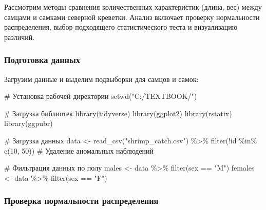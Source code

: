 \documentclass[
  letterpaper,
  DIV=11,
  numbers=noendperiod]{scrreprt}
\newenvironment{Shaded}{\begin{snugshade}}{\end{snugshade}}
\newcommand{\CommentTok}[1]{\textcolor[rgb]{0.37,0.37,0.37}{#1}}
\newcommand{\DecValTok}[1]{\textcolor[rgb]{0.68,0.00,0.00}{#1}}
\newcommand{\FunctionTok}[1]{\textcolor[rgb]{0.28,0.35,0.67}{#1}}
\newcommand{\NormalTok}[1]{\textcolor[rgb]{0.00,0.23,0.31}{#1}}
\newcommand{\OtherTok}[1]{\textcolor[rgb]{0.00,0.23,0.31}{#1}}
\newcommand{\SpecialCharTok}[1]{\textcolor[rgb]{0.37,0.37,0.37}{#1}}
\newcommand{\StringTok}[1]{\textcolor[rgb]{0.13,0.47,0.30}{#1}}
\begin{document}
Рассмотрим методы сравнения количественных характеристик (длина, вес)
между самцами и самками северной креветки. Анализ включает проверку
нормальности распределения, выбор подходящего статистического теста и
визуализацию различий.

\subsubsection{Подготовка
данных}\label{ux43fux43eux434ux433ux43eux442ux43eux432ux43aux430-ux434ux430ux43dux43dux44bux445}

Загрузим данные и выделим подвыборки для самцов и самок:

\begin{Shaded}
\begin{Highlighting}[]
\CommentTok{\# Установка рабочей директории}
\FunctionTok{setwd}\NormalTok{(}\StringTok{"C:/TEXTBOOK/"}\NormalTok{)}

\CommentTok{\# Загрузка библиотек  }
\FunctionTok{library}\NormalTok{(tidyverse)  }
\FunctionTok{library}\NormalTok{(ggplot2)  }
\FunctionTok{library}\NormalTok{(rstatix)}
\FunctionTok{library}\NormalTok{(ggpubr)}

\CommentTok{\# Загрузка данных  }
\NormalTok{data }\OtherTok{\textless{}{-}} \FunctionTok{read\_csv}\NormalTok{(}\StringTok{"shrimp\_catch.csv"}\NormalTok{) }\SpecialCharTok{\%\textgreater{}\%}
  \FunctionTok{filter}\NormalTok{(}\SpecialCharTok{!}\NormalTok{id }\SpecialCharTok{\%in\%} \FunctionTok{c}\NormalTok{(}\DecValTok{10}\NormalTok{, }\DecValTok{50}\NormalTok{))  }\CommentTok{\# Удаление аномальных наблюдений }

\CommentTok{\# Фильтрация данных по полу  }
\NormalTok{males }\OtherTok{\textless{}{-}}\NormalTok{ data }\SpecialCharTok{\%\textgreater{}\%} \FunctionTok{filter}\NormalTok{(sex }\SpecialCharTok{==} \StringTok{"M"}\NormalTok{)  }
\NormalTok{females }\OtherTok{\textless{}{-}}\NormalTok{ data }\SpecialCharTok{\%\textgreater{}\%} \FunctionTok{filter}\NormalTok{(sex }\SpecialCharTok{==} \StringTok{"F"}\NormalTok{) }
\end{Highlighting}
\end{Shaded}

\subsubsection{Проверка нормальности
распределения}\label{ux43fux440ux43eux432ux435ux440ux43aux430-ux43dux43eux440ux43cux430ux43bux44cux43dux43eux441ux442ux438-ux440ux430ux441ux43fux440ux435ux434ux435ux43bux435ux43dux438ux44f}
\end{document}
